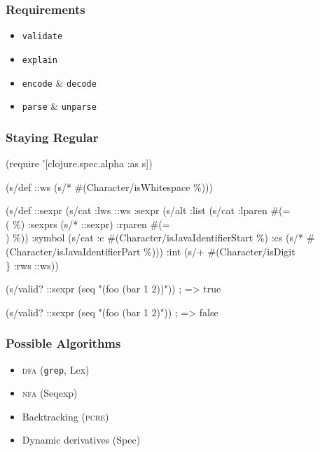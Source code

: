 \documentclass{beamer}
\begin{document}

\begin{frame}
\frametitle{Requirements}

\begin{itemize}
\item \texttt{validate}
\item \texttt{explain}
\item \texttt{encode} \& \texttt{decode}
\item \texttt{parse} \& \texttt{unparse}
\end{itemize}
\end{frame}


\begin{frame}[fragile]
\frametitle{Staying Regular}

{\scriptsize
\begin{semiverbatim}
(require '[clojure.spec.alpha :as s])

(s/def ::ws (s/* \#(Character/isWhitespace \%)))

(s/def ::sexpr
  (s/cat
    :lws ::ws
    :sexpr (s/alt
             :list (s/cat :lparen \#(= \\( \%)
                          :sexprs (s/* ::sexpr)
                          :rparen #(= \\) \%))
             :symbol (s/cat :c #(Character/isJavaIdentifierStart \%)
                            :cs (s/* #(Character/isJavaIdentifierPart \%)))
             :int (s/+ \#(Character/isDigit \\\}%
    :rws ::ws))

(s/valid? ::sexpr (seq "(foo (bar 1 2))"))
; => true

(s/valid? ::sexpr (seq "(foo (bar 1 2)"))
; => false
\end{semiverbatim}
}

\end{frame}


\begin{frame}
\frametitle{Possible Algorithms}

\begin{itemize}
\item \textsc{dfa} (\texttt{grep}, Lex)
\item \textsc{nfa} (Seqexp)
\item Backtracking (\textsc{pcre})
\item Dynamic derivatives (Spec)
\end{itemize}

\end{frame}
\end{document}
